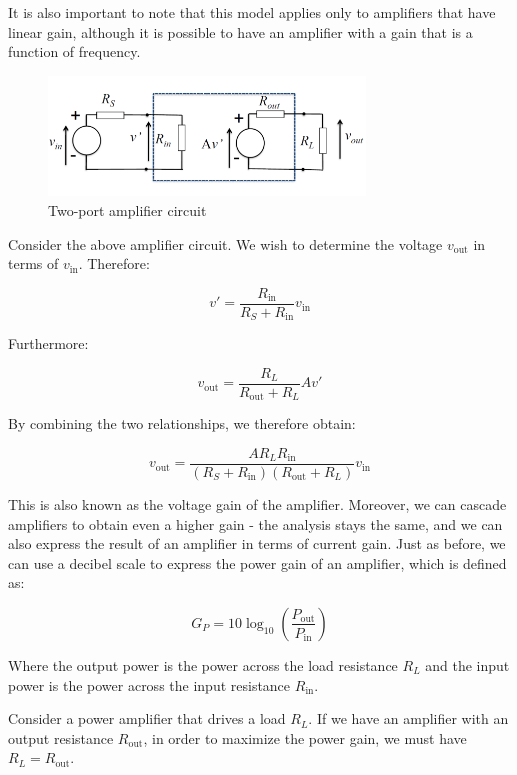 \documentclass{article}
\begin{document}
It is also important to note that this model applies only to amplifiers that have linear gain, although it is possible to have an amplifier with a gain that is a function of frequency.

\begin{figure}[h]
    \centering
    \includegraphics[width=0.75\textwidth]{images/amplifier1.png}
    \caption{Two-port amplifier circuit}
    \label{fig:amplifier}
\end{figure}

Consider the above amplifier circuit. We wish to determine the voltage $v_{\text{out}}$ in terms of $v_{\text{in}}$. Therefore:

\[ v' = \frac{R_{\text{in}}}{R_S + R_{\text{in}}}v_{\text{in}} \]

Furthermore:

\[ v_{\text{out}} = \frac{R_L}{R_{\text{out}} + R_L}Av' \]

By combining the two relationships, we therefore obtain:

\[ v_{\text{out}} = \frac{AR_LR_{\text{in}}}{(R_S + R_{\text{in}})(R_{\text{out}} + R_L)}v_{\text{in}} \]

This is also known as the voltage gain of the amplifier. Moreover, we can cascade amplifiers to obtain even a higher gain - the analysis stays the same, and we can also express the result of an amplifier in terms of current gain. Just as before, we can use a decibel scale to express the power gain of an amplifier, which is defined as:

\[ G_P = 10\log_{10}\left(\frac{P_{\text{out}}}{P_{\text{in}}}\right) \]

Where the output power is the power across the load resistance $R_L$ and the input power is the power across the input resistance $R_{\text{in}}$.

\begin{proposition}
    Consider a power amplifier that drives a load $R_L$. If we have an amplifier with an output resistance $R_{\text{out}}$, in order to maximize the power gain, we must have $R_L = R_{\text{out}}$.
\end{proposition}
\end{document}

